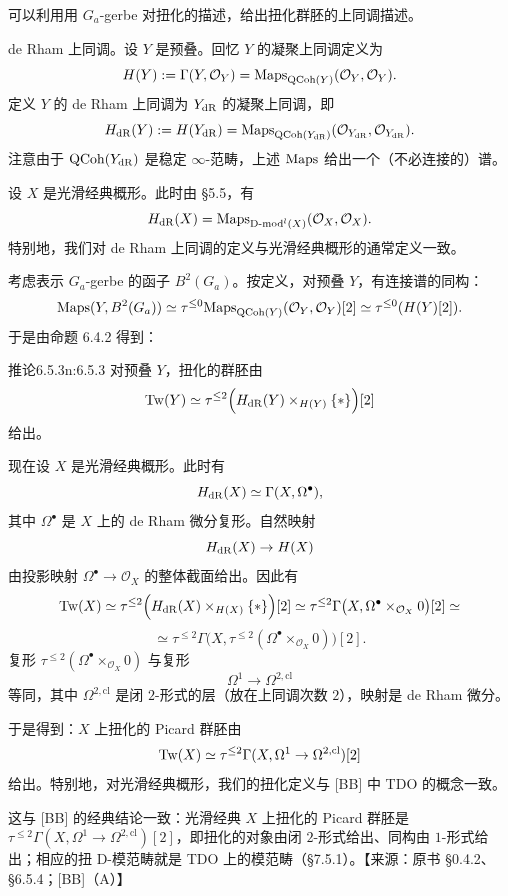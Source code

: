 可以利用用 $G_a$-gerbe 对扭化的描述，给出扭化群胚的上同调描述。

de Rham 上同调。设 $Y$ 是预叠。回忆 $Y$ 的凝聚上同调定义为
\[
H(Y):=\Gamma(Y,\mathcal{O}_Y)=\mathrm{Maps}_{\mathrm{QCoh}(Y)}(\mathcal{O}_Y,\mathcal{O}_Y).
\]
定义 $Y$ 的 de Rham 上同调为 $Y_{\mathrm{dR}}$ 的凝聚上同调，即
\[
H_{\mathrm{dR}}(Y):=H(Y_{\mathrm{dR}})=\mathrm{Maps}_{\mathrm{QCoh}(Y_{\mathrm{dR}})}(\mathcal{O}_{Y_{\mathrm{dR}}},\mathcal{O}_{Y_{\mathrm{dR}}}).
\]
注意由于 $\mathrm{QCoh}(Y_{\mathrm{dR}})$ 是稳定 $\infty$-范畴，上述 $\mathrm{Maps}$ 给出一个（不必连接的）谱。

设 $X$ 是光滑经典概形。此时由 §5.5，有
\[
H_{\mathrm{dR}}(X)=\mathrm{Maps}_{\mathrm{D\text{-}mod}^l(X)}(\mathcal{O}_X,\mathcal{O}_X).
\]
特别地，我们对 de Rham 上同调的定义与光滑经典概形的通常定义一致。

考虑表示 $G_a$-gerbe 的函子 $B^2(G_a)$。按定义，对预叠 $Y$，有连接谱的同构：
\[
\mathrm{Maps}(Y,B^2(G_a))\simeq\tau^{\leq 0}\mathrm{Maps}_{\mathrm{QCoh}(Y)}(\mathcal{O}_Y,\mathcal{O}_Y)[2]\simeq\tau^{\leq 0}(H(Y)[2]).
\]
于是由命题 6.4.2 得到：

\begin{othm}{推论}{6.5.3}{n:6.5.3}
对预叠 $Y$，扭化的群胚由
\[
\mathrm{Tw}(Y)\simeq\tau^{\leq 2}\Big(H_{\mathrm{dR}}(Y)\times_{H(Y)}\{*\}\Big)[2]
\]
给出。
\end{othm}

现在设 $X$ 是光滑经典概形。此时有
\[
H_{\mathrm{dR}}(X)\simeq\Gamma(X,\Omega^\bullet),
\]
其中 $\Omega^\bullet$ 是 $X$ 上的 de Rham 微分复形。自然映射
\[
H_{\mathrm{dR}}(X)\to H(X)
\]
由投影映射 $\Omega^\bullet\to\mathcal{O}_X$ 的整体截面给出。因此有
\[
\mathrm{Tw}(X)\simeq\tau^{\leq 2}\Big(H_{\mathrm{dR}}(X)\times_{H(X)}\{*\}\Big)[2]\simeq\tau^{\leq 2}\Gamma\big(X,\Omega^\bullet\times_{\mathcal{O}_X}0\big)[2]\simeq
\]
\[
\simeq\tau^{\leq 2}\Gamma\big(X,\tau^{\leq 2}(\Omega^\bullet\times_{\mathcal{O}_X}0)\big)[2].
\]
复形 $\tau^{\leq 2}(\Omega^\bullet\times_{\mathcal{O}_X}0)$ 与复形
\[
\Omega^1\to\Omega^{2,\mathrm{cl}}
\]
等同，其中 $\Omega^{2,\mathrm{cl}}$ 是闭 $2$-形式的层（放在上同调次数 $2$），映射是 de Rham 微分。

于是得到：$X$ 上扭化的 Picard 群胚由
\[
\mathrm{Tw}(X)\simeq\tau^{\leq 2}\Gamma(X,\Omega^1\to\Omega^{2,\mathrm{cl}})[2]
\]
给出。特别地，对光滑经典概形，我们的扭化定义与 [BB] 中 TDO 的概念一致。

\begin{annote}
这与 [BB] 的经典结论一致：光滑经典 $X$ 上扭化的 Picard 群胚是 $\tau^{\leq 2}\Gamma(X,\Omega^1\to\Omega^{2,\mathrm{cl}})[2]$，即扭化的对象由闭 $2$-形式给出、同构由 $1$-形式给出；相应的扭 D-模范畴就是 TDO 上的模范畴（§7.5.1）。\hfill【来源：原书 §0.4.2、§6.5.4；[BB]（A）】
\end{annote}


